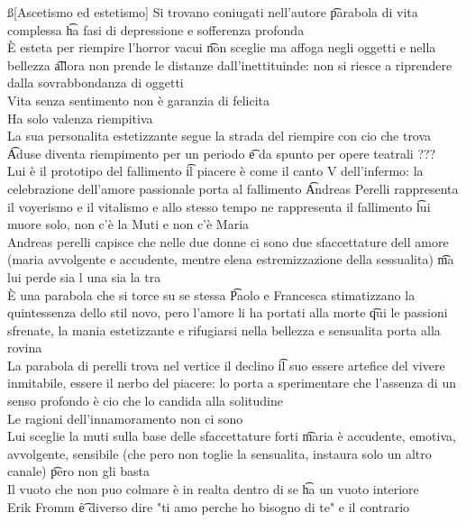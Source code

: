 \documentclass[12pt]{article}
\begin{document}
\ss[Ascetismo ed estetismo]
Si trovano coniugati nell'autore \t parabola di vita complessa \t ha fasi di depressione e sofferenza profonda \\
È esteta per riempire l'horror vacui \t non sceglie ma affoga negli oggetti e nella bellezza \t allora non prende le distanze dall'inettituinde: non si riesce a riprendere dalla sovrabbondanza di oggetti \\
Vita senza sentimento non è garanzia di felicita \\
Ha solo valenza riempitiva \\
La sua personalita estetizzante segue la strada del riempire con cio che trova \t Aduse diventa riempimento per un periodo \t e da spunto per opere teatrali ??? \\
Lui è il prototipo del fallimento \t il piacere è come il canto V dell'infermo: la celebrazione dell'amore passionale porta al fallimento \t Andreas Perelli rappresenta il voyerismo e il vitalismo e allo stesso tempo ne rappresenta il fallimento \t lui muore solo, non c'è la Muti e non c'è Maria \\
Andreas perelli capisce che nelle due donne ci sono due sfaccettature dell amore (maria avvolgente e accudente, mentre elena estremizzazione della sessualita) \t ma lui perde sia l una sia la tra \\
È una parabola che si torce su se stessa \t Paolo e Francesca stimatizzano la quintessenza dello stil novo, pero l'amore li ha portati alla morte \t qui le passioni sfrenate, la mania estetizzante e rifugiarsi nella bellezza e sensualita porta alla rovina \\
La parabola di perelli trova nel vertice il declino \t il suo essere artefice del vivere inmitabile, essere il nerbo del piacere: lo porta a sperimentare che l'assenza di un senso profondo è cio che lo candida alla solitudine \\
Le ragioni dell'innamoramento non ci sono \\
Lui sceglie la muti sulla base delle sfaccettature forti \t maria è accudente, emotiva, avvolgente, sensibile (che pero non toglie la sensualita, instaura solo un altro canale) \t pero non gli basta \\
Il vuoto che non puo colmare è in realta dentro di se \t ha un vuoto interiore \\
Erik Fromm \t è diverso dire "ti amo perche ho bisogno di te" e il contrario
\end{document}
